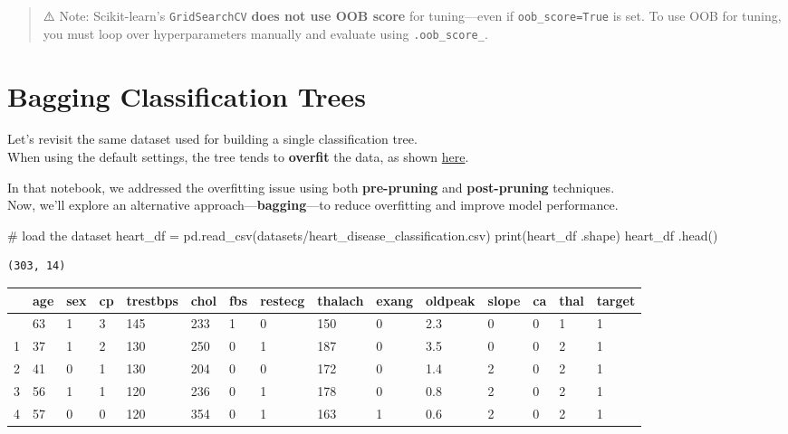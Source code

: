 \documentclass[
  letterpaper,
  DIV=11,
  numbers=noendperiod]{scrreprt}
\newenvironment{Shaded}{\begin{snugshade}}{\end{snugshade}}
\newcommand{\BuiltInTok}[1]{\textcolor[rgb]{0.00,0.23,0.31}{#1}}
\newcommand{\CommentTok}[1]{\textcolor[rgb]{0.37,0.37,0.37}{#1}}
\newcommand{\NormalTok}[1]{\textcolor[rgb]{0.00,0.23,0.31}{#1}}
\newcommand{\OperatorTok}[1]{\textcolor[rgb]{0.37,0.37,0.37}{#1}}
\newcommand{\StringTok}[1]{\textcolor[rgb]{0.13,0.47,0.30}{#1}}
\begin{document}
\begin{quote}
⚠️ Note: Scikit-learn's \texttt{GridSearchCV} \textbf{does not use OOB
score} for tuning---even if \texttt{oob\_score=True} is set. To use OOB
for tuning, you must loop over hyperparameters manually and evaluate
using \texttt{.oob\_score\_}.
\end{quote}

\section{Bagging Classification
Trees}\label{bagging-classification-trees}

Let's revisit the same dataset used for building a single classification
tree.\\
When using the default settings, the tree tends to \textbf{overfit} the
data, as shown
\href{https://lizhen0909.github.io/STAT303-3-class-notes/Classification\%20_Tree.html\#building-a-classification-tree}{here}.

In that notebook, we addressed the overfitting issue using both
\textbf{pre-pruning} and \textbf{post-pruning} techniques.\\
Now, we'll explore an alternative approach---\textbf{bagging}---to
reduce overfitting and improve model performance.

\begin{Shaded}
\begin{Highlighting}[]
\CommentTok{\# load the dataset}
\NormalTok{heart\_df  }\OperatorTok{=}\NormalTok{ pd.read\_csv(}\StringTok{\textquotesingle{}datasets/heart\_disease\_classification.csv\textquotesingle{}}\NormalTok{)}
\BuiltInTok{print}\NormalTok{(heart\_df .shape)}
\NormalTok{heart\_df .head()}
\end{Highlighting}
\end{Shaded}

\begin{verbatim}
(303, 14)
\end{verbatim}

\begin{longtable}[]{@{}lllllllllllllll@{}}
\toprule\noalign{}
& age & sex & cp & trestbps & chol & fbs & restecg & thalach & exang &
oldpeak & slope & ca & thal & target \\
\midrule\noalign{}
\endhead
\bottomrule\noalign{}
\endlastfoot
0 & 63 & 1 & 3 & 145 & 233 & 1 & 0 & 150 & 0 & 2.3 & 0 & 0 & 1 & 1 \\
1 & 37 & 1 & 2 & 130 & 250 & 0 & 1 & 187 & 0 & 3.5 & 0 & 0 & 2 & 1 \\
2 & 41 & 0 & 1 & 130 & 204 & 0 & 0 & 172 & 0 & 1.4 & 2 & 0 & 2 & 1 \\
3 & 56 & 1 & 1 & 120 & 236 & 0 & 1 & 178 & 0 & 0.8 & 2 & 0 & 2 & 1 \\
4 & 57 & 0 & 0 & 120 & 354 & 0 & 1 & 163 & 1 & 0.6 & 2 & 0 & 2 & 1 \\
\end{longtable}
\end{document}
